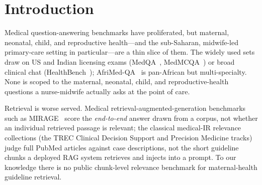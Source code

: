 \section{Introduction}
\label{sec:intro}

Medical question-answering benchmarks have proliferated, but maternal,
neonatal, child, and reproductive health---and the sub-Saharan, midwife-led
primary-care setting in particular---are a thin slice of them. The widely used
sets draw on US and Indian licensing exams (MedQA~\cite{jin2021medqa},
MedMCQA~\cite{pal2022medmcqa}) or broad clinical chat
(HealthBench~\cite{arora2025healthbench}); AfriMed-QA~\cite{olatunji2025afrimedqa}
is pan-African but multi-specialty. None is scoped to the maternal, neonatal, child,
and reproductive-health questions a nurse-midwife actually asks at the point of
care.

Retrieval is worse served. Medical retrieval-augmented-generation benchmarks
such as MIRAGE~\cite{xiong2024benchmarking} score the \emph{end-to-end} answer
drawn from a corpus, not whether an individual retrieved passage is relevant;
the classical medical-IR relevance collections (the TREC Clinical Decision
Support and Precision Medicine tracks) judge full PubMed articles against case
descriptions, not the short guideline chunks a deployed RAG system retrieves and
injects into a prompt. To our knowledge there is no public chunk-level relevance
benchmark for maternal-health guideline retrieval.

